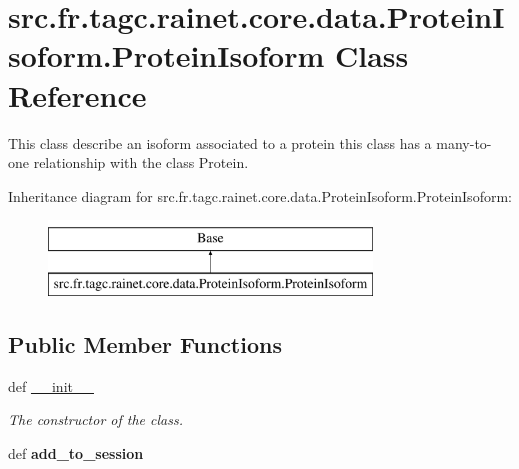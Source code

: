 \hypertarget{classsrc_1_1fr_1_1tagc_1_1rainet_1_1core_1_1data_1_1ProteinIsoform_1_1ProteinIsoform}{\section{src.\-fr.\-tagc.\-rainet.\-core.\-data.\-Protein\-Isoform.\-Protein\-Isoform Class Reference}
\label{classsrc_1_1fr_1_1tagc_1_1rainet_1_1core_1_1data_1_1ProteinIsoform_1_1ProteinIsoform}
}


This class describe an isoform associated to a protein this class has a many-\/to-\/one relationship with the class Protein.  


Inheritance diagram for src.\-fr.\-tagc.\-rainet.\-core.\-data.\-Protein\-Isoform.\-Protein\-Isoform\-:\begin{figure}[H]
\begin{center}
\leavevmode
\includegraphics[height=2.000000cm]{classsrc_1_1fr_1_1tagc_1_1rainet_1_1core_1_1data_1_1ProteinIsoform_1_1ProteinIsoform}
\end{center}
\end{figure}
\subsection*{Public Member Functions}
\begin{DoxyCompactItemize}
\item 
def \hyperlink{classsrc_1_1fr_1_1tagc_1_1rainet_1_1core_1_1data_1_1ProteinIsoform_1_1ProteinIsoform_aabb7839488a241a874eb46f0de2693be}{\-\_\-\-\_\-init\-\_\-\-\_\-}
\begin{DoxyCompactList}\small\item\em The constructor of the class. \end{DoxyCompactList}\item 
\hypertarget{classsrc_1_1fr_1_1tagc_1_1rainet_1_1core_1_1data_1_1ProteinIsoform_1_1ProteinIsoform_a3e4c3116e753fc3d2cb363e77b88138c}{def {\bfseries add\-\_\-to\-\_\-session}}\label{classsrc_1_1fr_1_1tagc_1_1rainet_1_1core_1_1data_1_1ProteinIsoform_1_1ProteinIsoform_a3e4c3116e753fc3d2cb363e77b88138c}

\end{DoxyCompactItemize}
